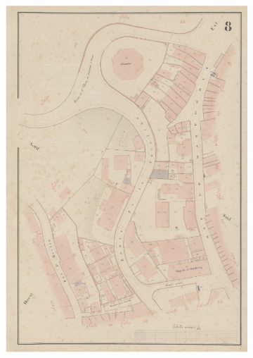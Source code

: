 \documentclass[12pt]{article}
\begin{document}
\begin{figure}[H]
    \centering
	\begin{subfigure}[b]{.4\textwidth}
		\centering
		\includegraphics[width=1\linewidth]{images/additional_image.png}  
		\label{fig:original-img}
	\end{subfigure}
	\begin{subfigure}[b]{.4\textwidth}
		\centering

\end{subfigure}
\end{figure}
\end{document}
